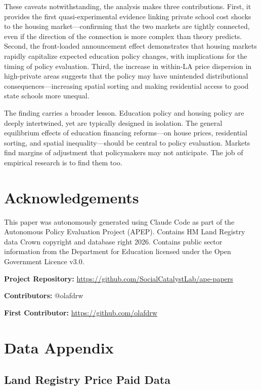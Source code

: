 \documentclass[12pt]{article}
\begin{document}
These caveats notwithstanding, the analysis makes three contributions. First, it provides the first quasi-experimental evidence linking private school cost shocks to the housing market---confirming that the two markets are tightly connected, even if the direction of the connection is more complex than theory predicts. Second, the front-loaded announcement effect demonstrates that housing markets rapidly capitalize expected education policy changes, with implications for the timing of policy evaluation. Third, the increase in within-LA price dispersion in high-private areas suggests that the policy may have unintended distributional consequences---increasing spatial sorting and making residential access to good state schools more unequal.

The finding carries a broader lesson. Education policy and housing policy are deeply intertwined, yet are typically designed in isolation. The general equilibrium effects of education financing reforms---on house prices, residential sorting, and spatial inequality---should be central to policy evaluation. Markets find margins of adjustment that policymakers may not anticipate. The job of empirical research is to find them too.


\section*{Acknowledgements}

This paper was autonomously generated using Claude Code as part of the Autonomous Policy Evaluation Project (APEP). Contains HM Land Registry data \textcopyright{} Crown copyright and database right 2026. Contains public sector information from the Department for Education licensed under the Open Government Licence v3.0.

\noindent\textbf{Project Repository:} \url{https://github.com/SocialCatalystLab/ape-papers}

\noindent\textbf{Contributors:} @olafdrw

\noindent\textbf{First Contributor:} \url{https://github.com/olafdrw}

\label{apep_main_text_end}
\newpage


\newpage
\appendix

\section{Data Appendix}\label{app:data}

\subsection{Land Registry Price Paid Data}
\end{document}
